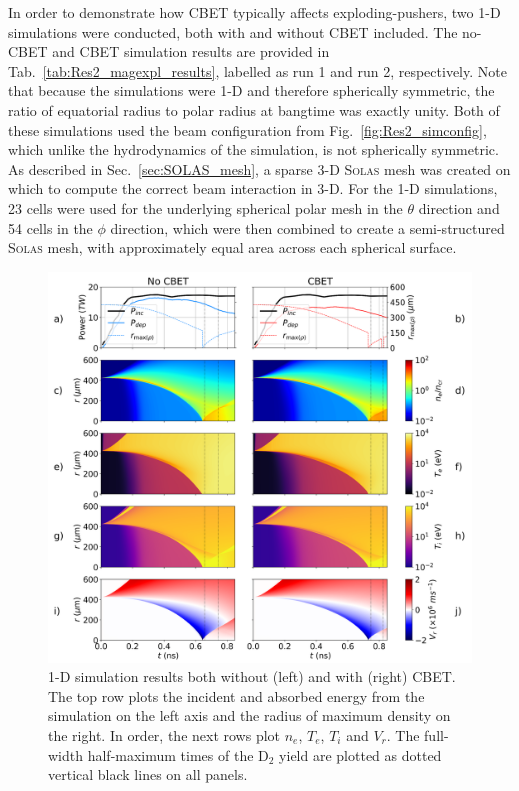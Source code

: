 In order to demonstrate how \ac{CBET} typically affects exploding-pushers, two 1-D simulations were conducted, both with and without \ac{CBET} included.
The no-\ac{CBET} and \ac{CBET} simulation results are provided in Tab.~\ref{tab:Res2_magexpl_results}, labelled as run 1 and run 2, respectively.
Note that because the simulations were 1-D and therefore spherically symmetric, the ratio of equatorial radius to polar radius at bangtime was exactly unity.
Both of these simulations used the beam configuration from Fig.~\ref{fig:Res2_simconfig}, which unlike the hydrodynamics of the simulation, is not spherically symmetric.
As described in Sec.~\ref{sec:SOLAS_mesh}, a sparse 3-D \textsc{Solas} mesh was created on which to compute the correct beam interaction in 3-D.
For the 1-D simulations, 23 cells were used for the underlying spherical polar mesh in the $\theta$ direction and 54 cells in the $\phi$ direction, which were then combined to create a semi-structured \textsc{Solas} mesh, with approximately equal area across each spherical surface.

\begin{figure}[t!]
    \includegraphics[width=\linewidth]{Results2/Images/expl_streaks.png}
    \centering
    \caption{1-D simulation results both without (left) and with (right) \ac{CBET}.
    The top row plots the incident and absorbed energy from the simulation on the left axis and the radius of maximum density on the right.
    In order, the next rows plot $n_e$, $T_e$, $T_i$ and $V_r$.
    The full-width half-maximum times of the D${}_{2}$ yield are plotted as dotted vertical black lines on all panels.}%
    \label{fig:Res2_expl_streaks}
\end{figure}

